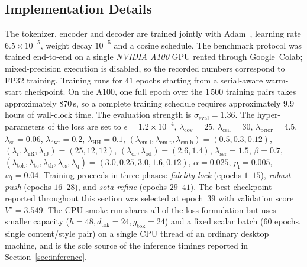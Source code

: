 \documentclass[runningheads]{llncs}
\begin{document}
\subsection{Implementation Details}
\label{sec:impl}
The tokenizer, encoder and decoder are trained jointly with Adam~\cite{adam}, learning rate $6.5\!\times\!10^{-5}$, weight decay $10^{-5}$ and a cosine schedule. The benchmark protocol was trained end-to-end on a single \emph{NVIDIA A100} GPU rented through Google~Colab; mixed-precision execution is disabled, so the recorded numbers correspond to FP32 training. Training runs for $41$ epochs starting from a serial-aware warm-start checkpoint. On the A100, one full epoch over the $1\,500$ training pairs takes approximately $870$\,s, so a complete training schedule requires approximately $9.9$ hours of wall-clock time. The evaluation strength is $\sigma_{\text{eval}}=1.36$. The hyper-parameters of the loss are set to $\epsilon\!=\!1.2\!\times\!10^{-4}$, $\lambda_{\text{cov}}\!=\!25$, $\lambda_{\text{ceil}}\!=\!30$, $\lambda_{\text{prior}}\!=\!4.5$, $\lambda_{\text{sc}}\!=\!0.06$, $\lambda_{\text{dwt}}\!=\!0.2$, $\lambda_{\text{HH}}\!=\!0.1$, $(\lambda_{\text{em-l}},\lambda_{\text{em-t}},\lambda_{\text{em-h}})\!=\!(0.5,0.3,0.12)$, $(\lambda_{\text{r}},\lambda_{\text{rR}},\lambda_{\text{rJ}})\!=\!(25,12,12)$, $(\lambda_{\text{or}},\lambda_{\text{od}})\!=\!(2.6,1.4)$, $\lambda_{\text{ser}}\!=\!1.5$, $\beta\!=\!0.7$, $(\lambda_{\text{tok}},\lambda_{\text{tc}},\lambda_{\text{th}},\lambda_{\text{cs}},\lambda_{\text{q}})\!=\!(3.0,0.25,3.0,1.6,0.12)$, $\alpha\!=\!0.025$, $p_{\text{f}}\!=\!0.005$, $w_{\text{f}}\!=\!0.04$. Training proceeds in three phases: \emph{fidelity-lock} (epochs $1$--$15$), \emph{robust-push} (epochs $16$--$28$), and \emph{sota-refine} (epochs $29$--$41$). The best checkpoint reported throughout this section was selected at epoch~$39$ with validation score $V^{\star}\!=\!3.549$. The CPU smoke run shares all of the loss formulation but uses smaller capacity ($h\!=\!48,d_{\text{tok}}\!=\!24,g_{\text{tok}}\!=\!24$) and a fixed scalar batch ($60$ epochs, single content/style pair) on a single CPU thread of an ordinary desktop machine, and is the sole source of the inference timings reported in Section~\ref{sec:inference}.
\end{document}

